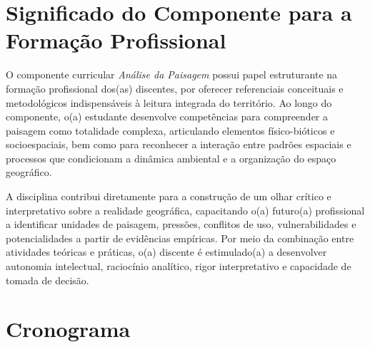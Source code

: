 \documentclass[11pt,a4paper]{article}
\begin{document}
\section*{Significado do Componente para a Formação Profissional}

O componente curricular \textit{Análise da Paisagem} possui papel estruturante na formação profissional dos(as) discentes, por oferecer referenciais conceituais e metodológicos indispensáveis à leitura integrada do território. Ao longo do componente, o(a) estudante desenvolve competências para compreender a paisagem como totalidade complexa, articulando elementos físico-bióticos e socioespaciais, bem como para reconhecer a interação entre padrões espaciais e processos que condicionam a dinâmica ambiental e a organização do espaço geográfico.

A disciplina contribui diretamente para a construção de um olhar crítico e interpretativo sobre a realidade geográfica, capacitando o(a) futuro(a) profissional a identificar unidades de paisagem, pressões, conflitos de uso, vulnerabilidades e potencialidades a partir de evidências empíricas. Por meio da combinação entre atividades teóricas e práticas, o(a) discente é estimulado(a) a desenvolver autonomia intelectual, raciocínio analítico, rigor interpretativo e capacidade de tomada de decisão.

\section*{Cronograma}
\end{document}
